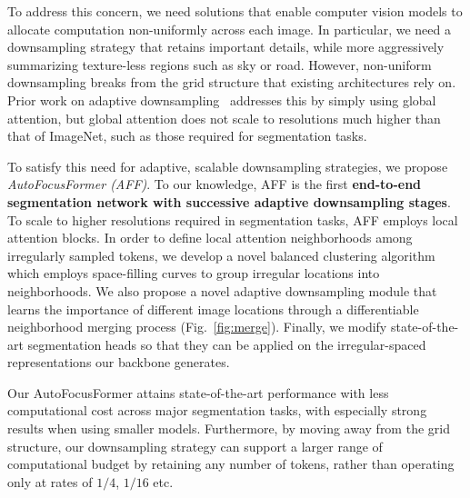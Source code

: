 \documentclass[10pt,twocolumn,letterpaper]{article}
\begin{document}
To address this concern, we need solutions that enable computer vision models to allocate computation non-uniformly across each image. In particular, we need a downsampling strategy that retains important details, while more aggressively summarizing texture-less regions such as sky or road. However, non-uniform downsampling breaks from the grid structure that existing architectures rely on. Prior work on adaptive downsampling~\cite{dynamicvit,notall,adaptivetoken} addresses this by simply using global attention, but global attention does not scale to resolutions much higher than that of ImageNet, such as those required for segmentation tasks.




To satisfy this need for adaptive, scalable downsampling strategies, we propose \textit{AutoFocusFormer (AFF)}. To our knowledge, AFF is the first \textbf{end-to-end segmentation network with successive adaptive downsampling stages}. To scale to higher resolutions required in segmentation tasks, AFF employs local attention blocks. In order to define local attention neighborhoods among irregularly sampled tokens, we develop a novel balanced clustering algorithm which employs space-filling curves to group irregular locations into neighborhoods. We also propose a novel adaptive downsampling module that learns the importance of different image locations through a differentiable neighborhood merging process (Fig.~\ref{fig:merge}). Finally, we modify state-of-the-art segmentation heads so that they can be applied on the irregular-spaced representations our backbone generates.



Our AutoFocusFormer attains state-of-the-art performance with less computational cost across major segmentation tasks, with especially strong results when using smaller models. Furthermore, by moving away from the grid structure, our downsampling strategy can support a larger range of computational budget by retaining any number of tokens, rather than operating only at rates of $1/4$, $1/16$ etc.
\end{document}
